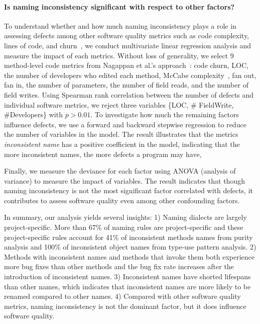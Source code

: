 \paragraph{Is naming inconsistency significant with respect to other factors?}  To understand whether and how much naming inconsistency plays a role in assessing defects among other software quality metrics such as code complexity, lines of code, and churn~\cite{nagappan:metricsICSE06, Menzies:metricsTSE07}, we conduct multivariate linear regression analysis and measure the impact of each metrics. Without loss of generality, we select 9 method-level code metrics from Nagappan et al.'s approach~\cite{nagappan:metricsICSE06}: code churn, LOC, the number of developers who edited each method, McCabe complexity~\cite{McCabe:complexity76}, fan out, fan in, the number of parameters, the number of field reads, and the number of field writes. 
Using Spearman rank correlation between the number of defects and individual software metrics, we reject three variables \{LOC, \# FieldWrite, \#Developers\} with $p>0.01$. To investigate how much the remaining factors influence defects, we use a forward and backward stepwise regression to reduce the number of variables in the model. The result illustrates that the metrics \textit{inconsistent name} has a positive coefficient in the model, indicating that the more inconsistent names, the more defects a program may have, 

Finally, we measure the deviance for each factor using ANOVA (analysis of variance) to measure the impact of variables. The result indicates that though naming inconsistency is not the most significant factor correlated with defects, it contributes to assess software quality even among other confounding factors.


In summary, our analysis yields several insights: 1) Naming dialects are largely project-specific. More than 67\% of naming rules are project-specific and these project-specific rules account for 41\% of inconsistent methods names from purity analysis and 100\% of inconsistent  object names from type-use pattern analysis. 2) Methods with inconsistent names and methods that invoke them both experience more bug fixes than other methods and the bug fix rate increases after the introduction of inconsistent names. 3) Inconsistent names have shorted lifespans than other names, which indicates that inconsistent names are more likely to be renamed compared to other names. 4) Compared with other software quality metrics, naming inconsistency is not the dominant factor, but it does influence software quality. 







